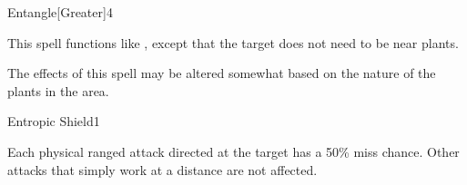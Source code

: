 \begin{spellsection}{Entangle}[Greater]{4}
    \begin{spellheader}
    \end{spellheader}
    \begin{spellcontent}
        \begin{spelltargetinginfo}
        \end{spelltargetinginfo}
        \begin{spelleffects}
            \spellspecial This spell functions like , except that the target does not need to be near plants.
        \end{spelleffects}
    \end{spellcontent}
    \begin{spellfooter}
        \spellnotes The effects of this spell may be altered somewhat based on the nature of the plants in the area.
        \miscastrandom
    \end{spellfooter}
\end{spellsection}

\begin{spellsection}{Entropic Shield}{1}
    \begin{spellheader}
    \end{spellheader}
    \begin{spellcontent}
        \begin{spelltargetinginfo}
        \end{spelltargetinginfo}
        \begin{spelleffects}
            \spelleffect Each physical ranged attack directed at the target has a 50\% miss chance. Other attacks that simply work at a distance are not affected.
            \spelldur \durshort \dismissable
        \end{spelleffects}
    \end{spellcontent}
    \begin{spellfooter}
        \miscastrandom
    \end{spellfooter}
\end{spellsection}

